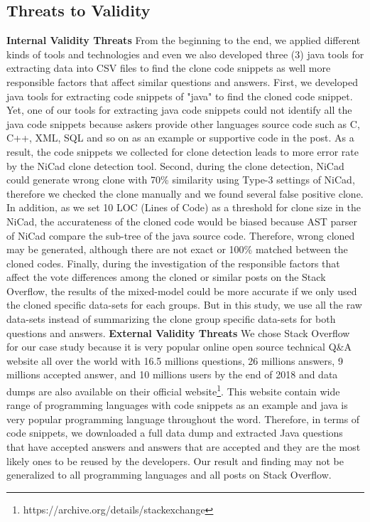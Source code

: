 \documentclass[conference]{IEEEtran}
\begin{document}
\subsection{Threats to Validity}\label{TTV}
\textbf{Internal Validity Threats} From the beginning to the end, we applied different kinds of tools and technologies and even we also developed three (3) java tools for extracting data into CSV files to find the clone code snippets as well more responsible factors that affect similar questions and answers. First, we developed java tools for extracting code snippets of "java" to find the cloned code snippet. Yet, one of our tools for extracting java code snippets could not identify all the java code snippets because askers provide other languages source code such as C, C++, XML, SQL and so on as an example or supportive code in the post. As a result, the code snippets we collected for clone detection leads to more error rate by the NiCad clone detection tool. Second, during the clone detection, NiCad could generate wrong clone with 70\% similarity using Type-3 settings of NiCad, therefore we checked the clone manually and we found several false positive clone. In addition, as we set 10 LOC (Lines of Code) as a threshold for clone size in the NiCad,  the accurateness of the cloned code would be biased because AST parser of NiCad compare the sub-tree of the java source code. Therefore, wrong cloned may be generated, although there are not exact or 100\% matched between the cloned codes. Finally, during the investigation of the responsible factors that affect the vote differences among the cloned or similar posts on the Stack Overflow, the results of the mixed-model could be more accurate if we only used the cloned specific data-sets for each groups. But in this study, we use all the raw data-sets instead of summarizing the clone group specific data-sets for both questions and answers.           
\newline
\textbf{External Validity Threats} We chose Stack Overflow for our case study because it is very popular online open source technical Q\&A website all over the world with 16.5 millions questions, 26 millions answers, 9 millions accepted answer, and 10 millions users by the end of 2018 and data dumps are also available on their official website\footnote{https://archive.org/details/stackexchange}. This website contain wide range of programming languages with code snippets as an example and java is very popular programming language throughout the word. Therefore, in terms of code snippets, we downloaded a full data dump and extracted Java questions that have accepted answers and answers that are accepted and they are the most likely ones to be reused by the developers. Our result and finding may not be generalized to all programming languages and all posts on Stack Overflow.
\end{document}
